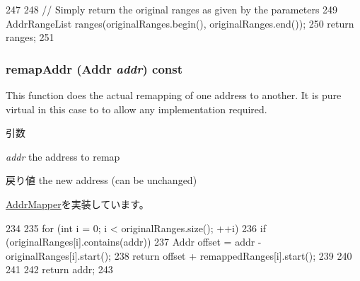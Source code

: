 \begin{DoxyCode}
247 {
248     // Simply return the original ranges as given by the parameters
249     AddrRangeList ranges(originalRanges.begin(), originalRanges.end());
250     return ranges;
251 }
\end{DoxyCode}
\hypertarget{classRangeAddrMapper_a0991da7dcb180722b611eb4a58a397a6}{
\subsubsection[{remapAddr}]{ remapAddr ({\bf Addr} {\em addr}) const}}
\label{classRangeAddrMapper_a0991da7dcb180722b611eb4a58a397a6}
This function does the actual remapping of one address to another. It is pure virtual in this case to to allow any implementation required. 
\begin{DoxyParams}{引数}
\item[{\em addr}]the address to remap \end{DoxyParams}
\begin{DoxyReturn}{戻り値}
the new address (can be unchanged) 
\end{DoxyReturn}


\hyperlink{classAddrMapper_a07fe2c0e12fc8be8a245306df09f1b2d}{AddrMapper}を実装しています。


\begin{DoxyCode}
234 {
235     for (int i = 0; i < originalRanges.size(); ++i) {
236         if (originalRanges[i].contains(addr)) {
237             Addr offset = addr - originalRanges[i].start();
238             return offset + remappedRanges[i].start();
239         }
240     }
241 
242     return addr;
243 }
\end{DoxyCode}


